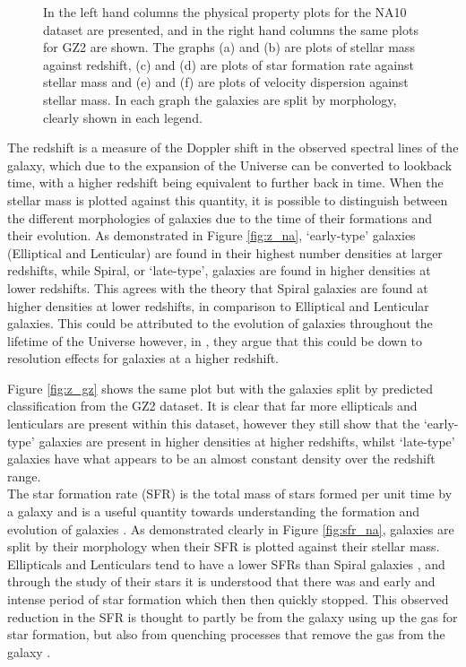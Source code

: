 \documentclass[12pt, onecolumn]{aa}
\begin{document}
\begin{figure}
\begin{subfigure}[t]{0.499\linewidth}
        \caption{}
        \label{fig:vdisp_gz}
    \end{subfigure}
    \caption{In the left hand columns the physical property plots for the NA10 dataset are presented, and in the right hand columns the same plots for GZ2 are shown. The graphs (a) and (b) are plots of stellar mass against redshift, (c) and (d) are plots of star formation rate against stellar mass and (e) and (f) are plots of velocity dispersion against stellar mass. In each graph the galaxies are split by morphology, clearly shown in each legend. }
    \label{fig:y}
\end{figure}

The redshift is a measure of the Doppler shift in the observed spectral lines of the galaxy, which due to the expansion of the Universe can be converted to lookback time, with a higher redshift being equivalent to further back in time. When the stellar mass is plotted against this quantity, it is possible to distinguish between the different morphologies of galaxies due to the time of their formations and their evolution. As demonstrated in Figure \ref{fig:z_na}, ‘early-type’ galaxies (Elliptical and Lenticular) are found in their highest number densities at larger redshifts, while Spiral, or ‘late-type’, galaxies are found in higher densities at lower redshifts. This agrees with the theory that Spiral galaxies are found at higher densities at lower redshifts, in comparison to Elliptical and Lenticular galaxies. This could be attributed to the evolution of galaxies throughout the lifetime of the Universe however, in \cite{2009MNRAS.393.1324B}, they argue that this could be down to resolution effects for galaxies at a higher redshift.

Figure \ref{fig:z_gz} shows the same plot but with the galaxies split by predicted classification from the GZ2 dataset. It is clear that far more ellipticals and lenticulars are present within this dataset, however they still show that the ‘early-type’ galaxies are present in higher densities at higher redshifts, whilst ‘late-type’ galaxies have what appears to be an almost constant density over the redshift range. \\

The star formation rate (SFR) is the total mass of stars formed per unit time by a galaxy and is a useful quantity towards understanding the formation and evolution of galaxies \citep{fundamentals_book}. As demonstrated clearly in Figure \ref{fig:sfr_na}, galaxies are split by their morphology when their SFR is plotted against their stellar mass. Ellipticals and Lenticulars tend to have a lower SFRs than Spiral galaxies \citep{2011IAUS..270..335G}, and through the study of their stars it is understood that there was and early and intense period of star formation which then then quickly stopped. This observed reduction in the SFR is thought to partly be from the galaxy using up the gas for star formation, but also from quenching processes that remove the gas from the galaxy \citep{2014MNRAS.440..889S}.
\end{document}
